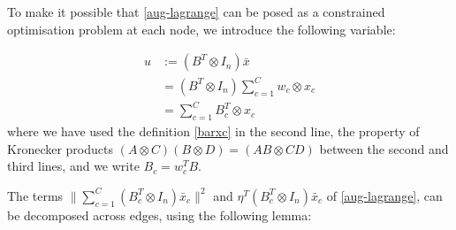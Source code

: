 \documentclass[conference]{IEEEtran}
\begin{document}
To make it possible that \ref{aug-lagrange} can be posed  as a constrained optimisation problem at each node, we introduce the following variable:

\begin{defn}
\begin{align*}
u &:= \left(B^T \otimes I_n\right)\bar{x} \\
& = \left(B^T \otimes I_n\right)\sum_{c=1}^C w_c \otimes x_c \\
& = \sum	_{c=1}^C B_c^T\otimes x_c
\end{align*}
where we have used the definition \eqref{barxc} in the second line, the property of Kronecker products \((A\otimes C)(B \otimes D) = (AB \otimes CD)\) between the second and third lines, and we write \(B_c = w_c^TB\).
\end{defn}

The terms \(\|\sum_{c=1}^C\left(B_c^T \otimes I_n\right)\bar{x}_c\|^2\) and \( \eta^T\left(B_c^T \otimes I_n\right)\bar{x}_c \) of \eqref{aug-lagrange}, can be decomposed across edges, using the following lemma:
\end{document}
